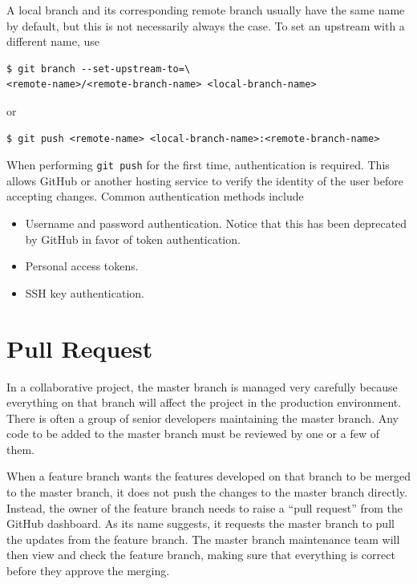 \begin{shortbox}

A local branch and its corresponding remote branch usually have the same name by default, but this is not necessarily always the case. To set an upstream with a different name, use
\begin{lstlisting}
$ git branch --set-upstream-to=\
<remote-name>/<remote-branch-name> <local-branch-name>
\end{lstlisting}
or
\begin{lstlisting}
$ git push <remote-name> <local-branch-name>:<remote-branch-name>
\end{lstlisting}

\end{shortbox}

When performing \texttt{git push} for the first time, authentication is required. This allows GitHub or another hosting service to verify the identity of the user before accepting changes. Common authentication methods include
\begin{itemize}
    \item Username and password authentication. Notice that this has been deprecated by GitHub in favor of token authentication.
    \item Personal access tokens.
    \item SSH key authentication.
\end{itemize}

\section{Pull Request} \label{sec:pull_request}

In a collaborative project, the master branch is managed very carefully because everything on that branch will affect the project in the production environment. There is often a group of senior developers maintaining the master branch. Any code to be added to the master branch must be reviewed by one or a few of them.

When a feature branch wants the features developed on that branch to be merged to the master branch, it does not push the changes to the master branch directly. Instead, the owner of the feature branch needs to raise a ``pull request'' from the GitHub dashboard. As its name suggests, it requests the master branch to pull the updates from the feature branch. The master branch maintenance team will then view and check the feature branch, making sure that everything is correct before they approve the merging.

